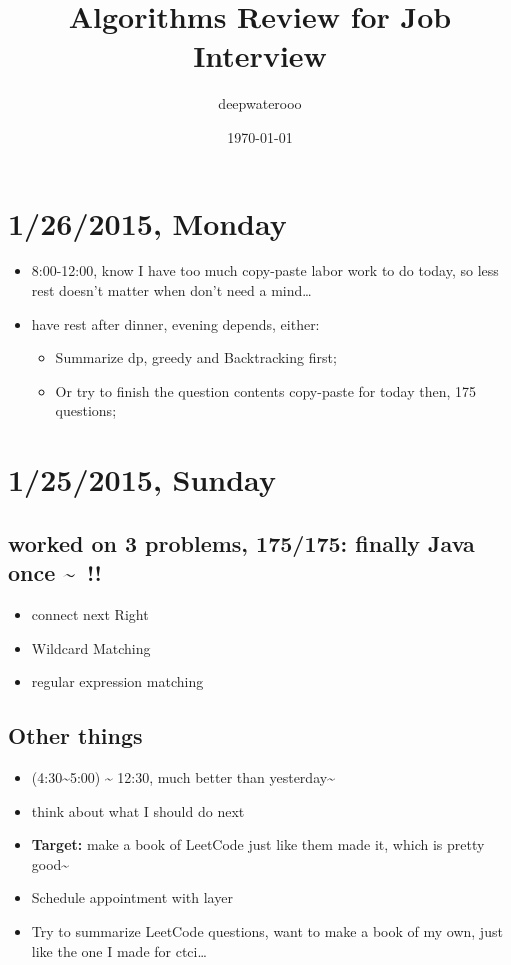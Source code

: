 \documentclass[9pt,b5paper]{article}
\author{deepwaterooo}
\date{\today}
\title{Algorithms Review for Job Interview}
\begin{document}
\maketitle
\tableofcontents


\section{1/26/2015, Monday}
\label{sec-1}
\begin{itemize}
\item 8:00-12:00, know I have too much copy-paste labor work to do today, so less rest doesn't matter when don't need a mind\ldots{}
\item have rest after dinner, evening depends, either:
\begin{itemize}
\item Summarize dp, greedy and Backtracking first;
\item Or try to finish the question contents copy-paste for today then, 175 questions;
\end{itemize}
\end{itemize}
\section{1/25/2015, Sunday}
\label{sec-2}
\subsection{worked on 3 problems, 175/175: finally Java once \textasciitilde{}~!!}
\label{sec-2-1}
\begin{itemize}
\item connect next Right
\item Wildcard Matching
\item regular expression matching
\end{itemize}
\subsection{Other things}
\label{sec-2-2}
\begin{itemize}
\item (4:30\textasciitilde{}5:00) \textasciitilde{} 12:30, much better than yesterday\textasciitilde{}~
\item think about what I should do next
\item \textbf{Target:} make a book of LeetCode just like them made it, which is pretty good\textasciitilde{}~
\item Schedule appointment with layer
\item Try to summarize LeetCode questions, want to make a book of my own, just like the one I made for ctci\ldots{}
\end{itemize}
\end{document}
